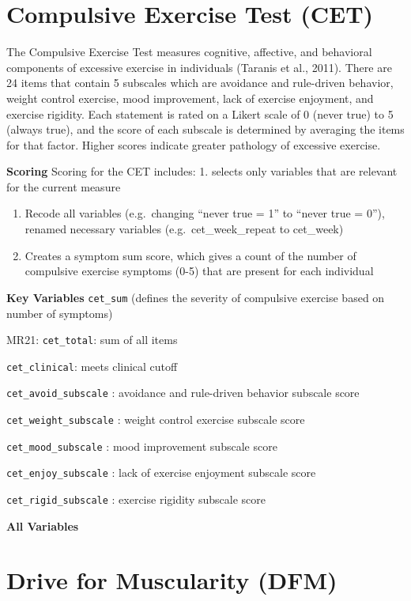 \documentclass[
]{book}
\begin{document}
\section{Compulsive Exercise Test (CET)}\label{compulsive-exercise-test-cet}

The Compulsive Exercise Test measures cognitive, affective, and
behavioral components of excessive exercise in individuals (Taranis et
al., 2011). There are 24 items that contain 5 subscales which are
avoidance and rule-driven behavior, weight control exercise, mood
improvement, lack of exercise enjoyment, and exercise rigidity. Each
statement is rated on a Likert scale of 0 (never true) to 5 (always
true), and the score of each subscale is determined by averaging the
items for that factor. Higher scores indicate greater pathology of
excessive exercise.

\textbf{Scoring} Scoring for the CET includes: 1. selects only variables that
are relevant for the current measure

\begin{enumerate}
\def\labelenumi{\arabic{enumi}.}
\setcounter{enumi}{1}
\item
  Recode all variables (e.g.~changing ``never true = 1'' to ``never true
  = 0''), renamed necessary variables (e.g.~cet\_week\_repeat to
  cet\_week)
\item
  Creates a symptom sum score, which gives a count of the number of
  compulsive exercise symptoms (0-5) that are present for each
  individual
\end{enumerate}

\textbf{Key Variables} \texttt{cet\_sum} (defines the severity of compulsive exercise
based on number of symptoms)

MR21: \texttt{cet\_total}: sum of all items

\texttt{cet\_clinical}: meets clinical cutoff

\texttt{cet\_avoid\_subscale} : avoidance and rule-driven behavior subscale score

\texttt{cet\_weight\_subscale} : weight control exercise subscale score

\texttt{cet\_mood\_subscale} : mood improvement subscale score

\texttt{cet\_enjoy\_subscale} : lack of exercise enjoyment subscale score

\texttt{cet\_rigid\_subscale} : exercise rigidity subscale score

\textbf{All Variables}

\section{Drive for Muscularity (DFM)}\label{drive-for-muscularity-dfm}
\end{document}
